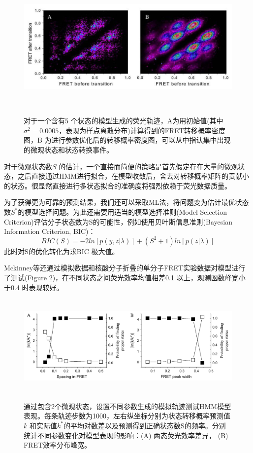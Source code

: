 \documentclass[11pt, a4paper]{article}
\begin{document}
\begin{figure}[htb]
  \centering
  \includegraphics[height=6.5cm]{Fig_tdp.PNG}\\
  \caption{对于一个含有5 个状态的模型生成的荧光轨迹，A为用初始值(其中$\sigma^2=0.0005$，表现为样点离散分布)计算得到的FRET转移概率密度图，B 为进行参数优化后的转移概率密度图，可以从中指认集中出现的微观状态和状态转换事件。}
  \label{fig:tdp}
\end{figure}


对于微观状态数$S$ 的估计，一个直接而简便的策略是首先假定存在大量的微观状态，之后直接通过HMM进行拟合，在模型收敛后，舍去对转移概率矩阵的贡献小的状态。很显然直接进行多状态拟合的准确度将强烈依赖于荧光数据质量。

为了获得更为可靠的预测结果，我们还可以采取ML法，将问题变为估计最优状态数$S^*$的模型选择问题。为此还需要用适当的模型选择准则(Model Selection Criterion)评估分子状态数为S的可能性，例如使用贝叶斯信息准则(Bayesian Information Criterion, BIC)：
\begin{equation}
BIC(S)=-2ln[p(y,z|\lambda)]+(S^2+1)ln[p(z|\lambda)]
\end{equation}
此时对S的优化转化为求BIC 极大值。

Mckinney等还通过模拟数据和核酸分子折叠的单分子FRET实验数据对模型进行了测试(Figure \ref{fig:test})，在不同状态之间荧光效率均值相差0.1 以上，观测函数峰宽小于0.4 时表现较好。

\begin{figure}[htb]
  \centering
  \includegraphics[height=5cm]{Fig_test.PNG}\\
  \caption{通过包含2个微观状态，设置不同参数生成的模拟轨迹测试HMM模型表现。每条轨迹步数为1000，左右纵坐标分别为状态转移概率预测值$k$ 和实际值$k^*$的平均对数差以及预测得到正确状态数S的频率。分别统计不同参数变化对模型表现的影响：(A) 两态荧光效率差异， (B) FRET效率分布峰宽。}%
  \label{fig:test}
\end{figure}
\end{document}
